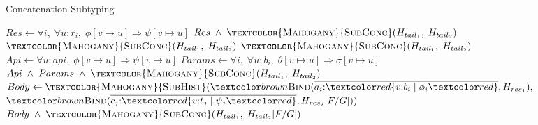 \begin{algorithm}[H]
    \caption{Concatenation Subtyping}\label{alg:subconc}
    \begin{algorithmic}[1]
                \Case{$\epsilon$, $\epsilon$}
                    \State \Return \True
                \EndCase
                    \State $Res \gets \forall i, \;\forall u{:}r_i, \; \phi[v \mapsto u] \Longrightarrow \psi[v \mapsto u]$
                    \State \Return $Res \;\land\; \Call{\textcolor{Mahogany}{SubConc}}{H_{tail_1}, \;H_{tail_2}}$
                \EndCase
                    \State \Return $\Call{\textcolor{Mahogany}{SubConc}}{H_{tail_1}, \;H_{tail_2}}$
                \EndCase
                    \State \Return $\Call{\textcolor{Mahogany}{SubConc}}{H_{tail_1}, \;H_{tail_2}}$
                \EndCase
                    \State $Api \gets \forall u{:}api, \;\phi[v \mapsto u] \Longrightarrow \psi[v \mapsto u]$
                    \State $Params \gets \forall i, \;\forall u{:}b_i, \;\theta[v \mapsto u] \Longrightarrow \sigma[v \mapsto u]$
                    \State \Return $Api \;\land\; Params \;\land\; \Call{\textcolor{Mahogany}{SubConc}}{H_{tail_1}, \;H_{tail_2}}$
                \EndCase
                    \State $Body \gets \textsc{\textcolor{Mahogany}{SubHist}}(\bind(\overline{a_i{:}\overa{v{:}b_i \;|\; \phi_i}}, H_{res_1}),$
                    \State \hspace{7.5em}$\bind(\overline{c_j{:}\overa{v{:}t_j \;|\; \psi_j}}, H_{res_2}[F/G]))$
                    \State \Return $Body \;\land\; \Call{\textcolor{Mahogany}{SubConc}}{H_{tail_1}, \;H_{tail_2}[F/G]}$
                \EndCase
                \Default
                    \State \Return \False
                \EndCase
            \EndMatch
        \EndProcedure
    \end{algorithmic}
\end{algorithm}

